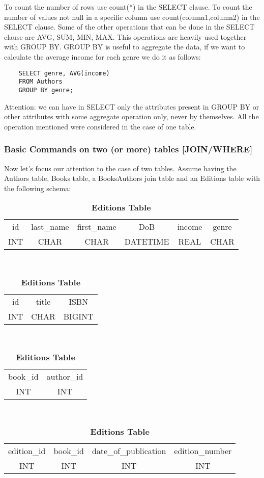 \documentclass[a4page, 11pt]{article}
\begin{document}
To count the number of rows use count(*) in the SELECT clause. To count the number of values not null in a specific column use count(column1,column2) in the SELECT clause. Some of the other operations that can be done in the SELECT clause are AVG, SUM, MIN, MAX.\newline
This operations are heavily used together with GROUP BY. GROUP BY  is useful to aggregate the data, if we want to calculate the average income for each genre we do it as follows:
\begin{lstlisting}
	SELECT genre, AVG(income)
	FROM Authors
	GROUP BY genre;
\end{lstlisting}
Attention: we can have in SELECT only the attributes present in GROUP BY or other attributes with some aggregate operation only, never by themselves. All the operation mentioned were considered in the case of one table.

\subsubsection{Basic Commands on two (or more) tables [JOIN/WHERE]}
Now let's focus our attention to the case of two tables. Assume having the Authors table, Books table, a BooksAuthors join table and an Editions table with the following schema:
\begin{table}[h]
	\centering
	\begin{tabular}{c c c c c c}
	id & last\_name & first\_name & DoB & income & genre\\
	INT & CHAR & CHAR & DATETIME & REAL & CHAR
	\end{tabular}
\caption*{\textbf{Authors Table}}
~\\
	\centering
	\begin{tabular}{c c c}
	id & title & ISBN\\
	INT & CHAR & BIGINT
	\end{tabular}
\caption*{\textbf{Books Table}}
~\\
	\centering
	\begin{tabular}{c c}
	book\_id & author\_id\\
	INT & INT
	\end{tabular}
\caption*{\textbf{BooksAuthors Table}}
~\\
	\begin{tabular}{c c c c}
	edition\_id & book\_id & date\_of\_publication & edition\_number\\
	INT & INT & INT & INT
\end{tabular}
\caption*{\textbf{Editions Table}}
\end{table}
\end{document}
